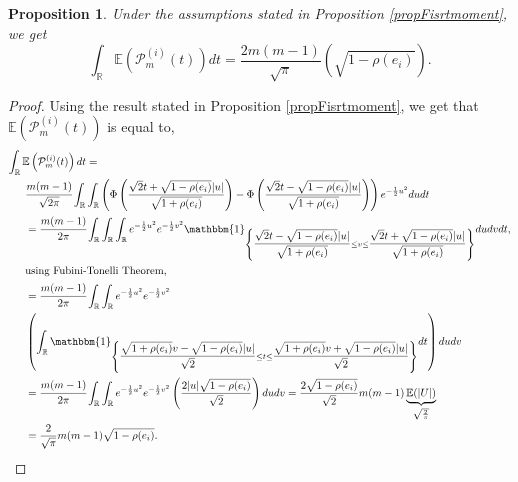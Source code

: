 \documentclass[12pt]{article}
\theoremstyle{Theorem}
\newtheorem{Proposition}[Theorem]{Proposition}
\begin{document}
\begin{Proposition}
Under the assumptions stated in Proposition \ref{propFisrtmoment}, we get 
\begin{equation}
\label{totalvariation}
\int_{\mathbb{R}} \mathbb{E}\left(\mathcal{P}^{(i)}_{m}(t)\right) dt = \frac{2m(m-1)}{\sqrt{\pi}}\left(\sqrt{1-\rho(e_i)}  \right).
\end{equation}
\end{Proposition}
\begin{proof}
Using the result stated in Proposition \ref{propFisrtmoment}, we get that $\mathbb{E}\left(\mathcal{P}^{\scriptscriptstyle  (i)}_{m}(t) \right)$ is equal to,
{\small
\begin{align*}
\int_{\mathbb{R}} \mathbb{E}\left(\mathcal{P}^{(i)}_{m}(t)\right) dt & = \\
& \hspace{-2cm}\cfrac{m(m-1)}{\sqrt{2\pi}} \int_{\mathbb{R}}\int_{\mathbb{R}} \left(\Phi\left(\dfrac{\sqrt{2}t + \sqrt{1-\rho(e_i)}|u|}{\sqrt{1+\rho(e_i)}}\right) - \Phi\left(\dfrac{\sqrt{2}t - \sqrt{1-\rho(e_i)}|u|}{\sqrt{1+\rho(e_i)}}\right)\right)e^{-\frac{1}{2}u^2}dudt \\
& \hspace{-2cm}=\cfrac{m(m-1)}{2\pi} \int_{\mathbb{R}}\int_{\mathbb{R}}\int_{\mathbb{R}} e^{-\frac{1}{2}u^2}e^{-\frac{1}{2}v^2} \mathbbm{1}_{\left\{\dfrac{\sqrt{2}t - \sqrt{1-\rho(e_i)}|u|}{\sqrt{1+\rho(e_i)}}\leq v \leq\dfrac{\sqrt{2}t + \sqrt{1-\rho(e_i)}|u|}{\sqrt{1+\rho(e_i)}}\right\}} du dv dt ,\\
& \hspace{-2cm}\text{using Fubini-Tonelli Theorem,} \\
& \hspace{-2cm}= \cfrac{m(m-1)}{2\pi}\int_{\mathbb{R}}\int_{\mathbb{R}} e^{-\frac{1}{2}u^2}e^{-\frac{1}{2}v^2} \\
& \hspace{-2cm} \left(\int_{\mathbb{R}} \mathbbm{1}_{\left\{\dfrac{\sqrt{1+\rho(e_i)}v - \sqrt{1-\rho(e_i)}|u|}{\sqrt{2}}\leq t\leq\dfrac{\sqrt{1+\rho(e_i)}v + \sqrt{1-\rho(e_i)}|u|}{\sqrt{2}}\right\}} dt\right) du dv \\
& \hspace{-2cm}= \cfrac{m(m-1)}{2\pi} \int_{\mathbb{R}}\int_{\mathbb{R}} e^{-\frac{1}{2}u^2}e^{-\frac{1}{2}v^2}\left(\dfrac{2|u|\sqrt{1-\rho(e_i)}}{\sqrt{2}}\right)dudv = \frac{2\sqrt{1-\rho(e_i)}}{\sqrt{2}} m(m-1)\underbrace{\mathbb{E}(|U|)}_{\sqrt{\frac{2}{\pi}}}\\
&\hspace{-2cm}=\frac{2}{\sqrt{\pi}}m(m-1)\sqrt{1-\rho(e_i)}.
\end{align*}
}
\end{proof}
\end{document}
